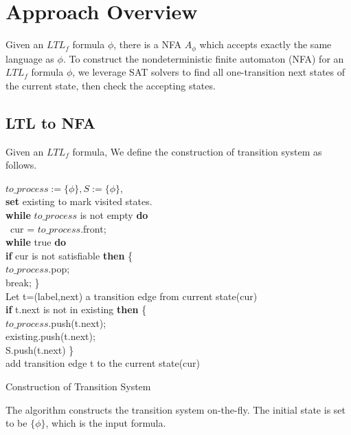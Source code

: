 \section{Approach Overview}
Given an $LTL_f$ formula $\phi$, there is a NFA $A_{\phi}$ which accepts exactly the same language as $\phi$. To construct the nondeterministic finite automaton (NFA) for an $ LTL_f$ formula $\phi$, we leverage SAT solvers to find all one-transition next states of the current state, then check the accepting states. 

\subsection{LTL to NFA}
Given an  $ LTL_f$ formula, We define the construction of transition system as follows. \\
  \begin{algorithm}[H]
    \SetAlgoNoLine
    \BlankLine
 $to\_process:=\{\phi\}, S:=\{\phi\}$, \\
\textbf{set} existing to mark visited states.\\
\textbf{while} $to\_process$ is not empty \textbf{do} \\
\ cur =  $to\_process$.front;  \\
\quad  \textbf{while} true \textbf{do} \\
\qquad   \textbf{if} cur is not satisfiable  \textbf{then} \{ \\
\qquad \quad $to\_process$.pop; \\
\qquad \quad break;     \}\\
 \qquad  Let t=(label,next) a transition edge from current state(cur) \\
\qquad\textbf{if} t.next is not in existing \textbf{then} \{ \\
\qquad \quad $to\_process$.push(t.next); \\
\qquad \quad existing.push(t.next); \\
\qquad  \quad S.push(t.next)  \}\\
\qquad  add transition edge t to the current state(cur)
 \caption{Construction of Transition System}
\end{algorithm}

The algorithm constructs the transition system on-the-fly. The initial state is set to be $\{\phi\}$, which is the input formula. 
